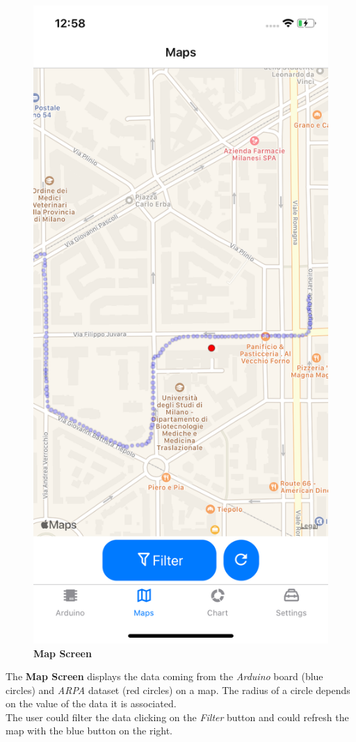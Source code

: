 \begin{figure}[H]
\centering
\includegraphics[height=.6\textheight]{./img/ui/map.png}
\caption{\textbf{Map Screen}}
\end{figure}
\begin{center}
The \textbf{Map Screen} displays the data coming from the \textit{Arduino} board (blue circles) and \textit{ARPA} dataset (red circles) on a map. The radius of a circle depends on the value of the data it is associated.\\
The user could filter the data clicking on the \textit{Filter} button and could refresh the map with the blue button on the right.
\end{center}

